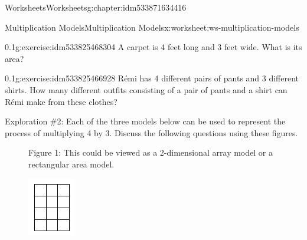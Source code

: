 \documentclass[twoside,11pt,]{book}
\begin{document}
\begin{chapterptx}{Worksheets}{}{Worksheets}{}{}{g:chapter:idm533871634416}
\begin{worksheet-section-numberless}{Multiplication Models}{}{Multiplication Models}{}{}{x:worksheet:ws-multiplication-models}
\begin{divisionexercise}{3}{}{0.1}{g:exercise:idm533825468304}
A carpet is 4 feet long and 3 feet wide. What is its area?%
\end{divisionexercise}%
\begin{divisionexercise}{4}{}{0.1}{g:exercise:idm533825466928}%
Rémi has 4 different pairs of pants and 3 different shirts. How many different outfits consisting of a pair of pants and a shirt can Rémi make from these clothes?%
\end{divisionexercise}%
\clearpage
\begin{introduction}{}%
Exploration \#2: Each of the three models below can be used to represent the process of multiplying 4 by 3.  Discuss the following questions using these figures.%
%
\begin{description}
\item[{}]Figure 1: This could be viewed as a 2-dimensional array model or a rectangular area model. \begin{sidebyside}{1}{0.45}{0.45}{0}%
\begin{sbspanel}{0.1}%
\includegraphics[width=1\linewidth]{images/mult-array.png}
\end{sbspanel}%

\end{sidebyside}
\end{description}
\end{introduction}
\end{worksheet-section-numberless}
\end{chapterptx}
\end{document}
